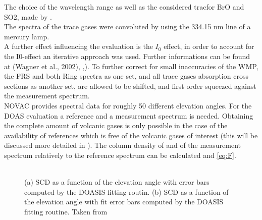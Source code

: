%
The choice of the wavelength range as well as the considered tracfor BrO and SO2, made by \citet{vogel2011volcanic}.\\
The spectra of the trace gases were convoluted by using the 334.15 nm line of a mercury lamp.\\
A further effect influencing the evaluation is the $I_{0}$ effect, in order to account for the I0-effect \citep{platt2008differential} an iterative approach was used. Further informations can be found at (Wagner et al., 2002), \cite{lubcke2014bro},\cite{vogel2011volcanic}).
To further correct for small inaccuracies of the WMP, the FRS and both Ring spectra as one set, and all trace gases absorption cross sections as another set, are allowed to be shifted, and first order squeezed against the measurement spectrum.\\
%
NOVAC provides spectral data for roughly 50 different elevation angles. For the DOAS evaluation a reference and a measurement spectrum is needed. Obtaining the complete amount of volcanic gases is only possible in the case of the availability of references which is free of the volcanic gases of interest (this will be discussed more detailed in ). The column density of    and  of the measurement spectrum relatively to the reference spectrum can be calculated  and \ref{eq:F}. \\
\\
\begin{figure}
	\caption{(a)  SCD as a function of the elevation angle with error bars computed by the DOASIS fitting routin. (b)  SCD as a function of the elevation angle with fit error bars computed by the DOASIS fitting routine.  Taken from \cite{WarnachSimon}}
	\label{fig:plumeref}
\end{figure}
